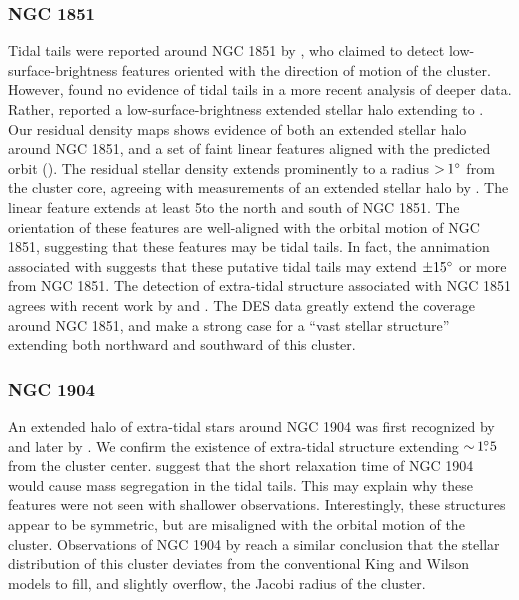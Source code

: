 \documentclass[twocolumn]{aastex61}
\begin{document}
\subsubsection{NGC 1851}
\label{sec:ngc1851}

Tidal tails were reported around NGC 1851 by \citet{Leon:2000}, who claimed to detect low-surface-brightness features oriented with the direction of motion of the cluster.
However, \citet{Olszewski:2009} found no evidence of tidal tails in a more recent analysis of deeper data.
Rather, \citet{Olszewski:2009} reported a low-surface-brightness extended stellar halo extending to .
Our residual density maps shows evidence of both an extended stellar halo around NGC 1851, and a set of faint linear features aligned with the predicted orbit ().
The residual stellar density extends prominently to a radius $ {>}\, 1 {}^{\circ}$ from the cluster core, agreeing with measurements of an extended stellar halo by \citet{Olszewski:2009}.
The linear feature extends at least 5\degree to the north and south of NGC 1851.
The orientation of these features are well-aligned with the orbital motion of NGC 1851, suggesting that these features may be tidal tails. 
In fact, the annimation associated with  suggests that these putative tidal tails may extend $\pm 15{}^{\circ}$ or more from NGC 1851.
The detection of extra-tidal structure associated with NGC 1851 agrees with recent work by \citet{Kuzma:2018} and \citet{Carballo-Bello:2018}.
The DES data greatly extend the coverage around NGC 1851, and make a strong case for a ``vast stellar structure'' \citep{Carballo-Bello:2018} extending both northward and southward of this cluster.

\subsubsection{NGC 1904}
\label{sec:ngc1904}

An extended halo of extra-tidal stars around NGC 1904 was first recognized by \citet{Grillmair:1995} and later by \citet{Leon:2000}. 
We confirm the existence of extra-tidal structure extending $ {\sim}\, 1\mbox{$.\!\!^\circ$}5$ from the cluster center.
\citet{Leon:2000} suggest that the short relaxation time of NGC 1904 would cause mass segregation in the tidal tails.
This may explain why these features were not seen with shallower observations.
Interestingly, these structures appear to be symmetric, but are misaligned with the orbital motion of the cluster.
Observations of NGC 1904 by \citet{Carballo-Bello:2018} reach a similar conclusion that the stellar distribution of this cluster deviates from the conventional King and Wilson models to fill, and slightly overflow, the Jacobi radius of the cluster.
\end{document}
